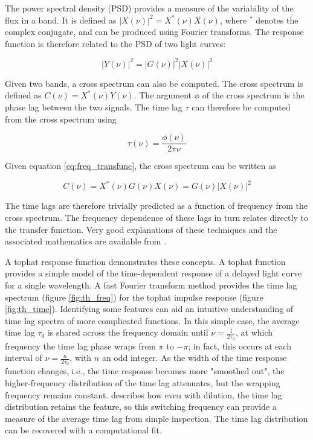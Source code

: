\documentclass[11pt,letterpaper]{article}
\begin{document}
    The power spectral density (PSD) provides a measure of the variability of the flux in a band. It is defined as $|X(\nu)|^2 = X^*(\nu)X(\nu)$, where $^*$ denotes the complex conjugate, and can be produced using Fourier transforms. The response function is therefore related to the PSD of two light curves:

    \begin{equation}
        |Y(\nu)|^2 = |G(\nu)|^2 |X(\nu)|^2
    \end{equation}

    Given two bands, a cross spectrum can also be computed. The cross spectrum is defined as $C(\nu) = X^*(\nu) Y(\nu)$. The argument $\phi$ of the cross spectrum is the phase lag between the two signals. The time lag $\tau$ can therefore be computed from the cross spectrum using

    \begin{equation}
        \tau(\nu) = \frac{\phi(\nu)}{2\pi\nu}
    \end{equation}

    Given equation \ref{eq:freq_transfunc}, the cross spectrum can be written as

    \begin{equation}
        C(\nu) = X^*(\nu) G(\nu) X(\nu) =  G(\nu) |X(\nu)|^2
    \end{equation}

    The time lags are therefore trivially predicted as a function of frequency from the cross spectrum. The frequency dependence of these lags in turn relates directly to the transfer function. Very good explanations of these techniques and the associated mathematics are available from \cite{2014A&ARv..22...72U}.

    A tophat response function demonstrates these concepts. A tophat function provides a simple model of the time-dependent response of a delayed light curve for a single wavelength. A fast Fourier transform method provides the time lag spectrum (figure \ref{fig:th_freq}) for the tophat impulse response (figure \ref{fig:th_time}). Identifying some features can aid an intuitive understanding of time lag spectra of more complicated functions. In this simple case, the average time lag $\tau_0$ is shared across the frequency domain until $\nu=\frac{1}{2\tau_0}$, at which frequency the time lag phase wraps from $\pi$ to $-\pi$; in fact, this occurs at each interval of $\nu=\frac{n}{2\tau_0}$, with $n$ an odd integer. As the width of the time response function changes, i.e., the time response becomes more "smoothed out", the higher-frequency distribution of the time lag attenuates, but the wrapping frequency remains constant. \cite{2014A&ARv..22...72U} describes how even with dilution, the time lag distribution retains the feature, so this switching frequency can provide a measure of the average time lag from simple inspection. The time lag distribution can be recovered with a computational fit.
\end{document}
